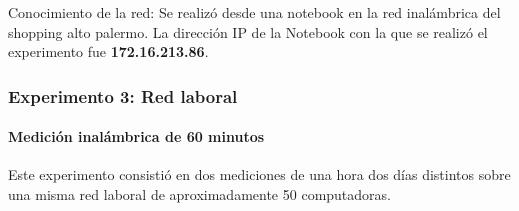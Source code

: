 Conocimiento de la red:
Se realizó desde una notebook en la red inalámbrica del shopping alto palermo.
La dirección IP de la Notebook con la que se realizó el experimento fue \textbf{172.16.213.86}.



\subsubsection{Experimento 3: Red laboral}
\paragraph{Medición inalámbrica de 60 minutos}

Este experimento consistió en dos mediciones de una hora dos días distintos sobre una misma red laboral de aproximadamente 50 computadoras.
